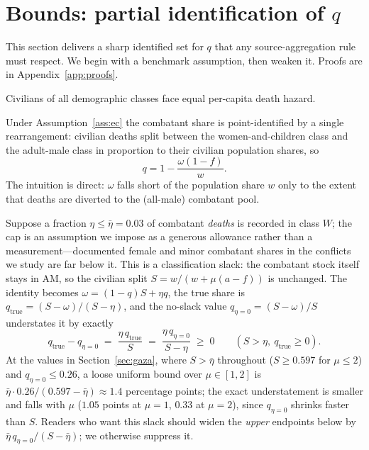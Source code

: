 \section{Bounds: partial identification of \texorpdfstring{$q$}{q}}\label{sec:bounds}

This section delivers a sharp identified set for $q$ that any source-aggregation rule must respect. We begin with a benchmark assumption, then weaken it. Proofs are in Appendix~\ref{app:proofs}.

\begin{assumption}\label{ass:ec}
Civilians of all demographic classes face equal per-capita death hazard.
\end{assumption}

Under Assumption~\ref{ass:ec} the combatant share is point-identified by a single rearrangement: civilian deaths split between the women-and-children class and the adult-male class in proportion to their civilian population shares, so
\begin{equation}\label{eq:ident}
q = 1 - \frac{\omega(1 - f)}{w}.
\end{equation}
The intuition is direct: $\omega$ falls short of the population share $w$ only to the extent that deaths are diverted to the (all-male) combatant pool.

\begin{remark}\label{rem:female-combatants}
Suppose a fraction $\eta\le\bar\eta=0.03$ of combatant \emph{deaths} is recorded in class $W$; the cap is an assumption we impose as a generous allowance rather than a measurement---documented female and minor combatant shares in the conflicts we study are far below it. This is a classification slack: the combatant stock itself stays in $\mathrm{AM}$, so the civilian split $S=w/(w+\mu(a-f))$ is unchanged. The identity becomes $\omega=(1-q)S+\eta q$, the true share is $q_{\mathrm{true}}=(S-\omega)/(S-\eta)$, and the no-slack value $q_{\eta=0}=(S-\omega)/S$ understates it by exactly
\[
q_{\mathrm{true}}-q_{\eta=0}\;=\;\frac{\eta\,q_{\mathrm{true}}}{S}\;=\;\frac{\eta\,q_{\eta=0}}{S-\eta}\;\ge\;0
\qquad(S>\eta,\ q_{\mathrm{true}}\ge 0).
\]
At the values in Section~\ref{sec:gaza}, where $S>\bar\eta$ throughout ($S\ge 0.597$ for $\mu\le 2$) and $q_{\eta=0}\le 0.26$, a loose uniform bound over $\mu\in[1,2]$ is $\bar\eta\cdot 0.26/(0.597-\bar\eta)\approx 1.4$ percentage points; the exact understatement is smaller and falls with $\mu$ ($1.05$ points at $\mu=1$, $0.33$ at $\mu=2$), since $q_{\eta=0}$ shrinks faster than $S$. Readers who want this slack should widen the \emph{upper} endpoints below by $\bar\eta\, q_{\eta=0}/(S-\bar\eta)$; we otherwise suppress it.
\end{remark}

